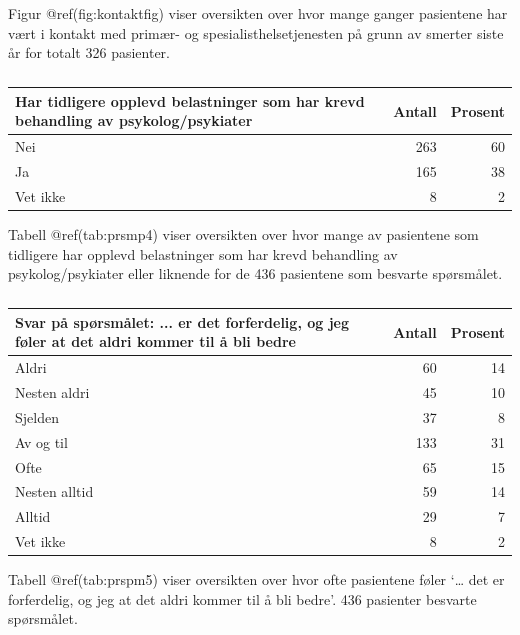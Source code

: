 \documentclass[
]{article}
\begin{document}
Figur @ref(fig:kontaktfig) viser oversikten over hvor mange ganger
pasientene har vært i kontakt med primær- og spesialisthelsetjenesten på
grunn av smerter siste år for totalt 326 pasienter.

\begin{table}

\caption{\label{tab:prsmp4}}
\centering
\begin{tabular}[t]{l|r|r}
\hline
Har tidligere opplevd belastninger som har krevd behandling av psykolog/psykiater & Antall  & Prosent\\
\hline
Nei & 263 & 60\\
\hline
Ja & 165 & 38\\
\hline
Vet ikke & 8 & 2\\
\hline
\end{tabular}
\end{table}

Tabell @ref(tab:prsmp4) viser oversikten over hvor mange av pasientene
som tidligere har opplevd belastninger som har krevd behandling av
psykolog/psykiater eller liknende for de 436 pasientene som besvarte
spørsmålet.

\begin{table}

\caption{\label{tab:prspm5}}
\centering
\begin{tabular}[t]{l|r|r}
\hline
Svar på spørsmålet: ... er det forferdelig, og jeg føler at det aldri kommer til å bli bedre & Antall  & Prosent\\
\hline
Aldri & 60 & 14\\
\hline
Nesten aldri & 45 & 10\\
\hline
Sjelden & 37 & 8\\
\hline
Av og til & 133 & 31\\
\hline
Ofte & 65 & 15\\
\hline
Nesten alltid & 59 & 14\\
\hline
Alltid & 29 & 7\\
\hline
Vet ikke & 8 & 2\\
\hline
\end{tabular}
\end{table}

Tabell @ref(tab:prspm5) viser oversikten over hvor ofte pasientene føler
`\ldots{} det er forferdelig, og jeg at det aldri kommer til å bli
bedre'. 436 pasienter besvarte spørsmålet.
\end{document}

